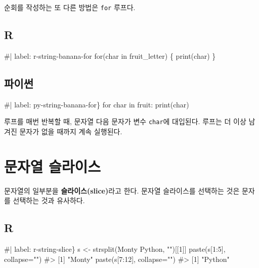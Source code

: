 \documentclass[
  letterpaper,
]{book}
\newenvironment{Shaded}{\begin{snugshade}}{\end{snugshade}}
\newcommand{\NormalTok}[1]{\textcolor[rgb]{0.00,0.23,0.31}{#1}}
\begin{document}
순회를 작성하는 또 다른 방법은 \texttt{for} 루프다.

\subsection{R}

\begin{Shaded}
\begin{Highlighting}[]
\NormalTok{\#| label: r{-}string{-}banana{-}for}
\NormalTok{for(char in fruit\_letter) \{}
\NormalTok{  print(char)}
\NormalTok{\}}
\end{Highlighting}
\end{Shaded}

\subsection{파이썬}

\begin{Shaded}
\begin{Highlighting}[]
\NormalTok{\#| label: py{-}string{-}banana{-}for\}}
\NormalTok{for char in fruit:}
\NormalTok{    print(char)}
\end{Highlighting}
\end{Shaded}

루프를 매번 반복할 때, 문자열 다음 문자가 변수 \texttt{char}에 대입된다.
루프는 더 이상 남겨진 문자가 없을 때까지 계속 실행된다.

\section{문자열 슬라이스}\label{r-string-slice}

  
 

문자열의 일부분을 \textbf{슬라이스(slice)}라고 한다. 문자열 슬라이스를
선택하는 것은 문자를 선택하는 것과 유사하다.

\subsection{R}

\begin{Shaded}
\begin{Highlighting}[]
\NormalTok{\#| label: r{-}string{-}slice\}}
\NormalTok{s \textless{}{-} strsplit(\textquotesingle{}Monty Python\textquotesingle{}, "")[[1]]}
\NormalTok{paste(s[1:5], collapse="")}
\NormalTok{\#\textgreater{} [1] "Monty"}
\NormalTok{paste(s[7:12], collapse="")}
\NormalTok{\#\textgreater{} [1] "Python"}
\end{Highlighting}
\end{Shaded}
\end{document}
